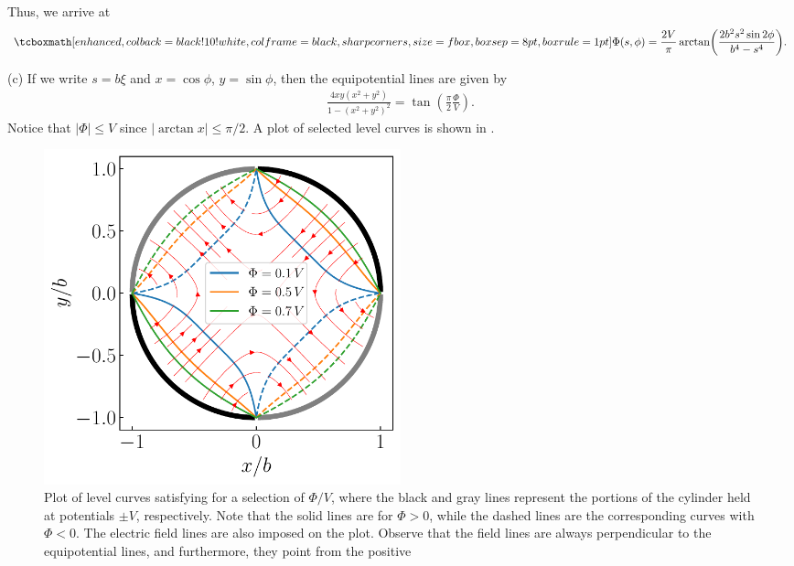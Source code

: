 {Thus, we arrive at
\begin{eqnarray}
    \eqbox{ \Phi(s,\phi) = \frac{2 V}{\pi} \arctan( \frac{2b^2s^2 \sin{2\phi}}{b^{4} - s^{4}} ) }
.\end{eqnarray}

(c) If we write $s = b\xi$ and $x = \cos{\phi}$, $y = \sin{\phi}$, then the equipotential lines are given by
\begin{eqnarray}
    \label{eq:lcurves}
    \frac{4 x y (x^2 + y^2)}{1 - (x^2 + y^2)^2} = \tan(\frac{\pi}{2} \frac{\Phi}{V})
.\end{eqnarray}
Notice that $|\Phi| \leq V$ since $|\arctan{x}| \leq \pi/2$.
A plot of selected level curves is shown in .

\begin{figure}[h!]
    \centering
    \includegraphics[width=0.5\textwidth]{prob2c-1.pdf}
    \caption{Plot of level curves satisfying  for a selection of $\Phi/V$, where the black and gray lines represent the portions of the cylinder held at potentials $\pm V$, respectively. Note that the solid lines are for $\Phi > 0$, while the dashed lines are the corresponding curves with $\Phi < 0$. The electric field lines are also imposed on the plot. Observe that the field lines are always perpendicular to the equipotential lines, and furthermore, they point from the positive}
    \label{fig:prob2c-1}
\end{figure}

}



